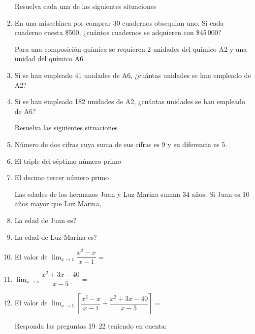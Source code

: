 \documentclass[letterpaper,twoside]{article}
\begin{document}
\begin{multicols}{2}
\begin{enumerate}
Resuelva cada una de las siguientes situaciones
\item En una miscelánea por comprar 30 cuadernos obsequian uno. Si cada cuaderno cuesta \$500, ¿cuántos cuadernos se adquieren con \$45\,000?

Para una composición química se requieren 2 unidades del químico A2 y una unidad del químico A6
\item Si se han empleado 41 unidades de A6, ¿cuántas unidades se han empleado de A2?
\item Si se han empleado 182 unidades de A2, ¿cuántas unidades se han empleado de A6?

Resuelva las siguientes situaciones
\item Número de dos cifras cuya suma de sus cifras es 9 y su diferencia es 5.
\item El triple del séptimo número primo
\item El decimo tercer número primo

Las edades de los hermanos Juan y Luz Marina suman 34 años. Si Juan es 10 años mayor que Luz Marina, 
\item La edad de Juan es?
\item La edad de Luz Marina es?
\item El valor de $\displaystyle{\lim_{x\rightarrow 1}\dfrac{x^{2}-x}{x-1}}=$
\item $\displaystyle{\lim_{x\rightarrow 5}\dfrac{x^{2}+3x-40}{x-5}}=$
\item El valor de $\displaystyle{\lim_{x\rightarrow 1}\left[\dfrac{x^{2}-x}{x-1}+\dfrac{x^{2}+3x-40}{x-5}\right]}=$

Responda las preguntas 19--22 teniendo en cuenta:


\end{enumerate}
\end{multicols}
\end{document}
